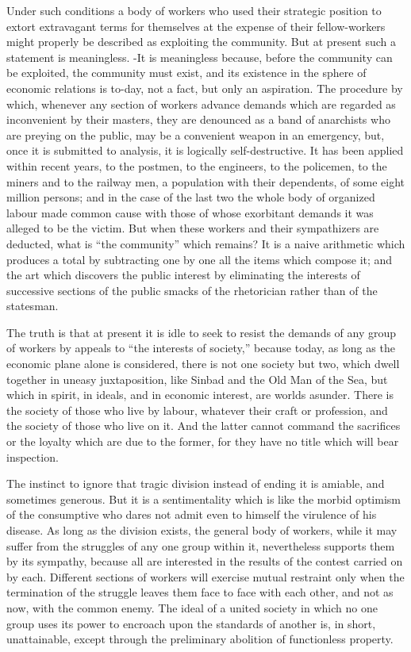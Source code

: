 \documentclass{book}
\begin{document}
Under such conditions a body of workers who used their strategic position to extort extravagant terms for themselves at the expense of their fellow-workers might properly be described as exploiting the community. But at present such a statement is meaningless. -It is meaningless because, before the community can be exploited, the community must exist, and its existence in the sphere of economic relations is to-day, not a fact, but only an aspiration. The procedure by which, whenever any section of workers advance demands which are regarded as inconvenient by their masters, they are denounced as a band of anarchists who are preying on the public, may be a convenient weapon in an emergency, but, once it is submitted to analysis, it is logically self-destructive. It has been applied within recent years, to the postmen, to the engineers, to the policemen, to the miners and to the railway men, a population with their dependents, of some eight million persons; and in the case of the last two the whole body of organized labour made common cause with those of whose exorbitant demands it was alleged to be the victim. But when these workers and their sympathizers are deducted, what is “the community” which remains? It is a naive arithmetic which produces a total by subtracting one by one all the items which compose it; and the art which discovers the public interest by eliminating the interests of successive sections of the public smacks of the rhetorician rather than of the statesman.

The truth is that at present it is idle to seek to resist the demands of any group of workers by appeals to “the interests of society,” because today, as long as the economic plane alone is considered, there is not one society but two, which dwell together in uneasy juxtaposition, like Sinbad and the Old Man of the Sea, but which in spirit, in ideals, and in economic interest, are worlds asunder. There is the society of those who live by labour, whatever their craft or profession, and the society of those who live on it. And the latter cannot command the sacrifices or the loyalty which are due to the former, for they have no title which will bear inspection.

The instinct to ignore that tragic division instead of ending it is amiable, and sometimes generous. But it is a sentimentality which is like the morbid optimism of the consumptive who dares not admit even to himself the virulence of his disease. As long as the division exists, the general body of workers, while it may suffer from the struggles of any one group within it, nevertheless supports them by its sympathy, because all are interested in the results of the contest carried on by each. Different sections of workers will exercise mutual restraint only when the termination of the struggle leaves them face to face with each other, and not as now, with the common enemy. The ideal of a united society in which no one group uses its power to encroach upon the standards of another is, in short, unattainable, except through the preliminary abolition of functionless property.
\end{document}
